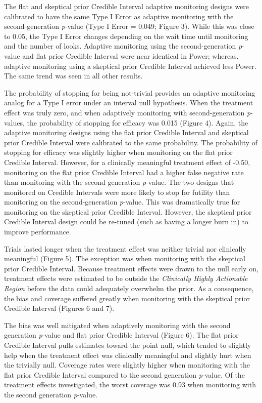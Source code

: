 \documentclass[12pt,oneside]{book}
\newlength{\li}\setlength{\li}{14.48pt}
\newlength{\di}\setlength{\di}{-3.5mm}
\theoremstyle{definition}
\theoremstyle{definition}
\theoremstyle{definition}
\theoremstyle{remark}
\begin{document}
The flat and skeptical prior Credible Interval adaptive monitoring
designs were calibrated to have the same Type I Error as adaptive
monitoring with the second-generation \emph{p}-value (Type I Error =
0.049; Figure 3). While this was close to 0.05, the Type I Error changes
depending on the wait time until monitoring and the number of looks.
Adaptive monitoring using the second-generation \emph{p}-value and flat
prior Credible Interval were near identical in Power; whereas, adaptive
monitoring using a skeptical prior Credible Interval achieved less
Power. The same trend was seen in all other results.

The probability of stopping for being not-trivial provides an adaptive
monitoring analog for a Type I error under an interval null hypothesis.
When the treatment effect was truly zero, and when adaptively monitoring
with second-generation \emph{p}-values, the probability of stopping for
efficacy was 0.015 (Figure 4). Again, the adaptive monitoring designs
using the flat prior Credible Interval and skeptical prior Credible
Interval were calibrated to the same probability. The probability of
stopping for efficacy was slightly higher when monitoring on the flat
prior Credible Interval. However, for a clinically meaningful treatment
effect of -0.50, monitoring on the flat prior Credible Interval had a
higher false negative rate than monitoring with the second generation
\emph{p}-value. The two designs that monitored on Credible Intervals
were more likely to stop for futility than monitoring on the
second-generation \emph{p}-value. This was dramatically true for
monitoring on the skeptical prior Credible Interval. However, the
skeptical prior Credible Interval design could be re-tuned (such as
having a longer burn in) to improve performance.

Trials lasted longer when the treatment effect was neither trivial nor
clinically meaningful (Figure 5). The exception was when monitoring with
the skeptical prior Credible Interval. Because treatment effects were
drawn to the null early on, treatment effects were estimated to be
outside the \emph{Clinically Highly Actionable Region} before the data
could adequately overwhelm the prior. As a consequence, the bias and
coverage suffered greatly when monitoring with the skeptical prior
Credible Interval (Figures 6 and 7).

The bias was well mitigated when adaptively monitoring with the second
generation \emph{p}-value and flat prior Credible Interval (Figure 6).
The flat prior Credible Interval pulls estimates toward the point null,
which tended to slightly help when the treatment effect was clinically
meaningful and slightly hurt when the trivially null. Coverage rates
were slightly higher when monitoring with the flat prior Credible
Interval compared to the second generation \emph{p}-value. Of the
treatment effects investigated, the worst coverage was 0.93 when
monitoring with the second generation \emph{p}-value.
\end{document}
